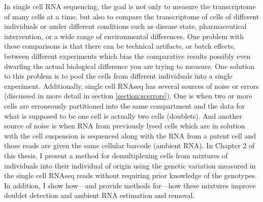 \par{
In single cell RNA sequencing, the goal is not only to measure the transcriptome of many cells at a time, but also to compare the transcriptome of cells of different individuals or under different conditions such as disease state, pharmaceutical intervention, or a wide range of environmental differences. One problem with these comparisons is that there can be technical artifacts, or batch effects, between different experiments which bias the comparative results possibly even dwarfing the actual biological difference you are trying to measure. One solution to this problem is to pool the cells from different individuals into a single experiment. Additionally, single cell RNAseq has several sources of noise or errors (discussed in more detail in section \ref{section:scerrors}). One is when two or more cells are erroneously partitioned into the same compartment and the data for what is supposed to be one cell is actually two cells (doublets). And another source of noise is when RNA from previously lysed cells which are in solution with the cell suspension is sequenced along with the RNA from a patent cell and those reads are given the same cellular barcode (ambient RNA). In Chapter 2 of this thesis, I present a method for demultiplexing cells from mixtures of individuals into their individual of origin using the genetic variation measured in the single cell RNAseq reads without requiring prior knowledge of the genotypes. In addition, I show how---and provide methods for---how these mixtures improve doublet detection and ambient RNA estimation and removal.
} \\


